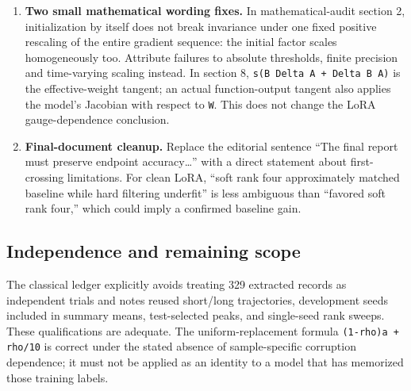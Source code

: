 \documentclass[
  british,
  10pt,
  a4paper,
]{article}
\begin{document}
\begin{enumerate}
  not adversarial pixels or model forward passes. Five seeds are the
  optimizer replication units. Neither image counts nor repeated radii
  turn this into thousands of optimizer
  replications\allowbreak{}.\allowbreak{} The exact two-sided sign
  probability \texttt{.0625} is correct under independent equiprobable
  pair signs under the null.
\item
  \textbf{Two small mathematical wording fixes.} In
  mathematical\allowbreak{}-\allowbreak{}audit section 2, initialization
  by itself does not break invariance under one fixed positive rescaling
  of the entire gradient sequence: the initial factor scales
  homogeneously too. Attribute failures to absolute
  thresholds,\allowbreak{} finite precision and
  time-\allowbreak{}varying scaling instead. In section 8,
  \texttt{s(B \allowbreak{}Delta \allowbreak{}A \allowbreak{}+ \allowbreak{}Delta \allowbreak{}B \allowbreak{}A)}
  is the effective-\allowbreak{}weight tangent; an actual
  function-\allowbreak{}output tangent also applies the model's Jacobian
  with respect to \texttt{W}. This does not change the LoRA
  gauge-\allowbreak{}dependence conclusion.\allowbreak{}
\item
  \textbf{Final-\allowbreak{}document cleanup.} Replace the editorial
  sentence ``The final report must preserve endpoint accuracy\ldots''
  with a direct statement about first-\allowbreak{}crossing
  limitations.\allowbreak{} For clean LoRA, ``soft rank four
  approximately matched baseline while hard filtering underfit'' is less
  ambiguous than ``favored soft rank four,'' which could imply a
  confirmed baseline gain.
\end{enumerate}

\subsection{Independence and remaining
scope}\label{final-synthesis-audit--independence-and-remaining-scope}

The classical ledger explicitly avoids treating 329 extracted records as
independent trials and notes reused short/long
trajectories\allowbreak{},\allowbreak{} development seeds included in
summary means, test-\allowbreak{}selected peaks, and
single-\allowbreak{}seed rank sweeps. These qualifications are adequate.
The uniform-\allowbreak{}replacement formula
\texttt{(1-\allowbreak{}rho)a \allowbreak{}+ \allowbreak{}rho/\allowbreak{}10}
is correct under the stated absence of sample-\allowbreak{}specific
corruption dependence; it must not be applied as an identity to a model
that has memorized those training labels.
\end{document}
